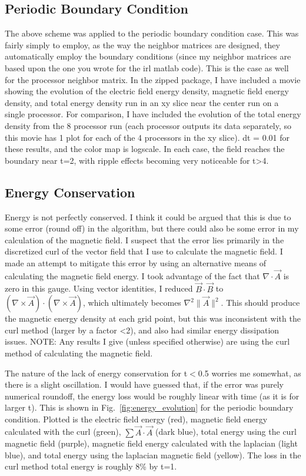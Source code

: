 \documentclass[a4paper]{article}
\begin{document}
\subsection{Periodic Boundary Condition}
The above scheme was applied to the periodic boundary condition case. This was
fairly simply to employ, as the way the neighbor matrices are designed, they
automatically employ the boundary conditions (since my neighbor matrices are 
based upon the one you wrote for the irl matlab code). This is the case as well
for the processor neighbor matrix. In the zipped package, I have included
a movie showing the evolution of the electric field energy density,
magnetic field energy density, and total energy density run in an xy slice near
the center run on a single processor.
For comparison, I have included the evolution of the total energy density from
the 8 processor run (each processor outputs its data separately, so this movie 
has 1 plot for each of the 4 processors in the xy slice). dt = 0.01 for these
results, and the color map is logscale. In each case, the field reaches 
the boundary near t=2, with ripple effects becoming very noticeable for t>4.

\subsection{Energy Conservation}
\label{sec:conservation}
Energy is not perfectly conserved. I think it could be argued that this is due
to some error (round off) in the algorithm, but there could also be some error
in my calculation of the magnetic field. I suspect that the error lies 
primarily in the discretized curl of the vector field that I use to calculate
the magnetic field. I made an attempt to mitigate this error by using an alternative
means of calculating the magnetic field energy. I took advantage of the fact
 that $\nabla \cdot \vec{A}$ is zero in
this gauge. Using vector identities, I reduced $\vec{B} \cdot \vec{B}$ to 
$(\nabla \times \vec{A})\cdot(\nabla \times \vec{A})$, which ultimately becomes
$\nabla^{2} \|\vec{A}\|^{2}$. This should produce the magnetic energy density at 
each grid point, but this was inconsistent with the curl method (larger
by a factor <2), and also had similar energy dissipation issues. NOTE: Any results
I give (unless specified otherwise) are using the curl method of calculating
the magnetic field.

The nature of the lack of energy conservation for t$<$0.5 worries me somewhat,
as there is a slight oscillation. I would have guessed that, if the error was
purely numerical roundoff, the energy loss would be roughly linear with time
(as it is for larger t). This is shown in Fig.~\ref{fig:energy_evolution}
for the periodic boundary condition. Plotted is the electric field energy (red),
magnetic field energy
calculated with the curl (green), $\sum \vec{A} \cdot \vec{A}$ (dark blue), 
total energy using the curl magnetic field (purple), magnetic field energy
calculated with the laplacian (light blue), and total energy using the
laplacian magnetic field (yellow). The loss in the curl method total energy is 
roughly 8\% by t=1.
\end{document}
